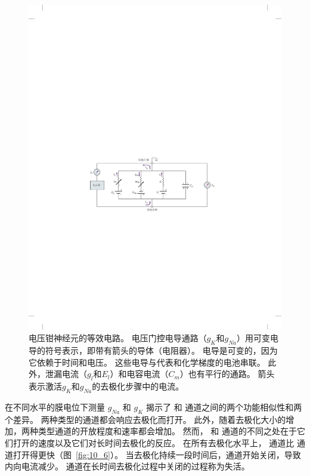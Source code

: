 \begin{figure}[htbp]
	\centering
	\includegraphics[width=0.8\linewidth]{chap10/fig_10_5}
	\caption{电压钳神经元的等效电路。
		电压门控电导通路（$g_K$和$g_{Na}$）用可变电导的符号表示，即带有箭头的导体（电阻器）。
		电导是可变的，因为它依赖于时间和电压。
		这些电导与代表和化学梯度的电池串联。
		此外，泄漏电流（$g_l$和$E_l$）和电容电流（$C_m$）也有平行的通路。
		箭头表示激活$g_K$和$g_{Na}$的去极化步骤中的电流。}
	\label{fig:10_5}
\end{figure}


在不同水平的膜电位下测量 $g_{Na}$ 和 $g_K$ 揭示了  和  通道之间的两个功能相似性和两个差异。
两种类型的通道都会响应去极化而打开。
此外，随着去极化大小的增加，两种类型通道的开放程度和速率都会增加。
然而， 和  通道的不同之处在于它们打开的速度以及它们对长时间去极化的反应。
在所有去极化水平上， 通道比  通道打开得更快（图~\ref{fig:10_6}）。 
当去极化持续一段时间后，通道开始关闭，导致内向电流减少。
 通道在长时间去极化过程中关闭的过程称为失活。


